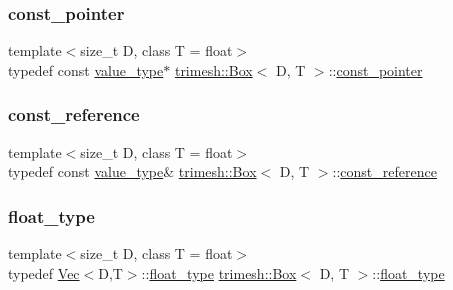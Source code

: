 \subsubsection{\texorpdfstring{const\+\_\+pointer}{const\_pointer}}
{\footnotesize\ttfamily template$<$size\+\_\+t D, class T = float$>$ \\
typedef const \hyperlink{classtrimesh_1_1Box_aa78431130c7bda4a326f3a23da88ba82}{value\+\_\+type}$\ast$ \hyperlink{classtrimesh_1_1Box}{trimesh\+::\+Box}$<$ D, T $>$\+::\hyperlink{classtrimesh_1_1Box_a9a9725eafb98d3340e22db0f9be77068}{const\+\_\+pointer}}

\mbox{\label{classtrimesh_1_1Box_ac674585eb2cf25c8749bd677ff25eaa7}} 
\subsubsection{\texorpdfstring{const\+\_\+reference}{const\_reference}}
{\footnotesize\ttfamily template$<$size\+\_\+t D, class T = float$>$ \\
typedef const \hyperlink{classtrimesh_1_1Box_aa78431130c7bda4a326f3a23da88ba82}{value\+\_\+type}\& \hyperlink{classtrimesh_1_1Box}{trimesh\+::\+Box}$<$ D, T $>$\+::\hyperlink{classtrimesh_1_1Box_ac674585eb2cf25c8749bd677ff25eaa7}{const\+\_\+reference}}

\mbox{\label{classtrimesh_1_1Box_aa3a7238ce00e96ceaf24ecbb1077b7a4}} 
\subsubsection{\texorpdfstring{float\+\_\+type}{float\_type}}
{\footnotesize\ttfamily template$<$size\+\_\+t D, class T = float$>$ \\
typedef \hyperlink{classtrimesh_1_1Vec}{Vec}$<$D,T$>$\+::\hyperlink{classtrimesh_1_1Box_aa3a7238ce00e96ceaf24ecbb1077b7a4}{float\+\_\+type} \hyperlink{classtrimesh_1_1Box}{trimesh\+::\+Box}$<$ D, T $>$\+::\hyperlink{classtrimesh_1_1Box_aa3a7238ce00e96ceaf24ecbb1077b7a4}{float\+\_\+type}}

\mbox{\label{classtrimesh_1_1Box_a208c806781f96a7001491a275dfa7655}} 
